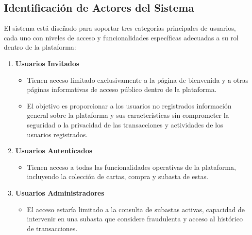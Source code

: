 \subsection{Identificación de Actores del Sistema} 
El sistema está diseñado para soportar tres categorías principales de usuarios, cada uno con niveles de acceso y funcionalidades específicas adecuadas a su rol dentro de la plataforma:
\begin{enumerate}
    \item \textbf{Usuarios Invitados}
    \begin{itemize}
        \item Tienen acceso limitado exclusivamente a la página de bienvenida y a otras páginas informativas de acceso público dentro de la plataforma.
        \item El objetivo es proporcionar a los usuarios no registrados información general sobre la plataforma y sus características sin comprometer la seguridad o la privacidad de las transacciones y actividades de los usuarios registrados.
    \end{itemize}
    
    \item \textbf{Usuarios Autenticados}
    \begin{itemize}
        \item Tienen acceso a todas las funcionalidades operativas de la plataforma, incluyendo la colección de cartas, compra y subasta de estas.
    \end{itemize}
    
    \item \textbf{Usuarios Administradores}
    \begin{itemize}
        \item El acceso estaría limitado a la consulta de subastas activas, capacidad de intervenir en una subasta que considere fraudulenta y acceso al histórico de transacciones.
    \end{itemize}
\end{enumerate}